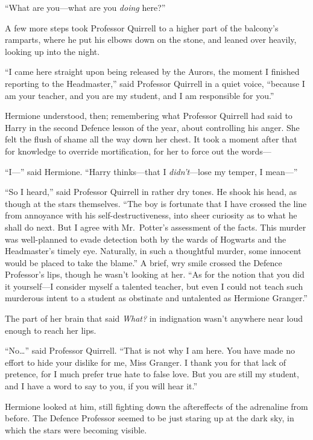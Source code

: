 ``What are you---what are you \emph{doing} here?''

A few more steps took Professor Quirrell to a higher part of the
balcony's ramparts, where he put his elbows down on the stone, and
leaned over heavily, looking up into the night.

``I came here straight upon being released by the Aurors, the moment I
finished reporting to the Headmaster,'' said Professor Quirrell in a
quiet voice, ``because I am your teacher, and you are my student, and I
am responsible for you.''

Hermione understood, then; remembering what Professor Quirrell had said
to Harry in the second Defence lesson of the year, about controlling his
anger. She felt the flush of shame all the way down her chest. It took a
moment after that for knowledge to override mortification, for her to
force out the words---

``I---'' said Hermione. ``Harry thinks---that I \emph{didn't}---lose my
temper, I mean---''

``So I heard,'' said Professor Quirrell in rather dry tones. He shook
his head, as though at the stars themselves. ``The boy is fortunate that
I have crossed the line from annoyance with his self-destructiveness,
into sheer curiosity as to what he shall do next. But I agree with
Mr.~Potter's assessment of the facts. This murder was well-planned to
evade detection both by the wards of Hogwarts and the Headmaster's
timely eye. Naturally, in such a thoughtful murder, some innocent would
be placed to take the blame.'' A brief, wry smile crossed the Defence
Professor's lips, though he wasn't looking at her. ``As for the notion
that you did it yourself---I consider myself a talented teacher, but
even I could not teach such murderous intent to a student as obstinate
and untalented as Hermione Granger.''

The part of her brain that said \emph{What?} in indignation wasn't
anywhere near loud enough to reach her lips.

``No\ldots{}'' said Professor Quirrell. ``That is not why I am here. You
have made no effort to hide your dislike for me, Miss Granger. I thank
you for that lack of pretence, for I much prefer true hate to false
love. But you are still my student, and I have a word to say to you, if
you will hear it.''

Hermione looked at him, still fighting down the aftereffects of the
adrenaline from before. The Defence Professor seemed to be just staring
up at the dark sky, in which the stars were becoming visible.

